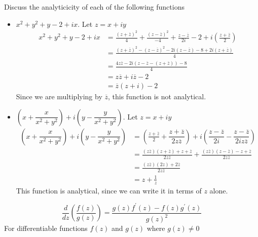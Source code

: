 \documentclass[12pt]{article}
\author{Warren Atkison}
\date{\today}
\newenvironment{theorem}[2][Theorem]{\begin{trivlist}
\item[\hskip \labelsep {\bfseries #1} \hskip \labelsep {\bfseries #2.}]}{\end{trivlist}}
\newenvironment{exercise}[2][Exercise]{\begin{trivlist}
\item[\hskip \labelsep {\bfseries #1} \hskip \labelsep {\bfseries #2.}]}{\end{trivlist}}
\begin{document}
\fancyhf{}
\fancyhead[R]{\today}
\fancyfoot[R]{\thepage}

\begin{exercise}{11e}
	Discuss the analyticicity of each of the following functions
	\begin{itemize}
		\item[(e)] $x^2 + y^2 + y - 2 + ix$.  
			Let $z = x + iy$
			\begin{align*}
				x^2 + y^2 + y - 2 + ix &= \frac{(z + \overline{z})^2}{4} + \frac{(z - \overline{z})^2}{-4} + \frac{z - \overline{z}}{2i} - 2 + i\left(\frac{z + \overline{z}}{2}\right) \\
						       &= \frac{(z + \overline{z})^2 - (z - \overline{z})^2 - 2i(z - \overline{z}) - 8 + 2i(z + \overline{z})}{4} \\
						       &= \frac{4z\overline{z} - 2i(z - \overline{z} - (z + \overline{z})) - 8}{4} \\
						       &= z\overline{z} + i\overline{z} - 2 \\
						       &= \overline{z}\left(z + i\right) - 2
			\end{align*}
			Since we are multiplying by $\overline{z}$, this function is not analytical.
		\item[(f)] $\left(x + \dfrac{x}{x^2 + y^2}\right) + i\left(y - \dfrac{y}{x^2 + y^2}\right)$.	
			Let $z = x + iy$
			\begin{align*}
				\left(x + \dfrac{x}{x^2 + y^2}\right) + i\left(y - \dfrac{y}{x^2 + y^2}\right) &= \left(\frac{z +\overline{z}}{2} + \dfrac{z + \overline{z}}{2z\overline{z}}\right) + i\left(\dfrac{z - \overline{z}}{2i} - \dfrac{z - \overline{z}}{2iz\overline{z}}\right) \\
													       &= \frac{(z\overline{z})(z + \overline{z}) + z + \overline{z}}{2z\overline{z}} + \frac{(z\overline{z})(z - \overline{z}) - z + \overline{z}}{2z\overline{z}} \\
													       &= \frac{(z\overline{z})(2z) + 2\overline{z}}{2z\overline{z}} \\
													       &= z + \frac{1}{z}
			\end{align*}
			This function is analytical, since we can write it in terms of $z$ alone.	
	\end{itemize}
\end{exercise}
\newpage
\begin{theorem}{Quotient Rule}
	\[ 
		\dfrac{d}{dz} \left(\dfrac{f(z)}{g(z)}\right) = \dfrac{g(z)f^{'}(z) - f(z)g^{'}(z)}{g(z)^2}
	\]
	For differentiable functions $f(z)$ and $g(z)$ where $g(z) \neq 0$ 
\end{theorem}
\end{document}
